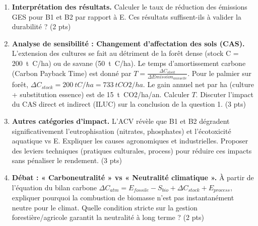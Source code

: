 \documentclass[11pt]{article}
\begin{document}
\begin{exercice}
\begin{enumerate}
\item \textbf{Interprétation des résultats.} Calculer le taux de réduction des émissions GES pour B1 et B2 par rapport à E. Ces résultats suffisent-ils à valider la durabilité ? (2 pts)
\item \textbf{Analyse de sensibilité : Changement d'affectation des sols (CAS).} L'extension des cultures se fait au détriment de la forêt dense (stock C = \SI{200}{t C/ha}) ou de savane (\SI{50}{t C/ha}). Le temps d'amortissement carbone (Carbon Payback Time) est donné par $T = \frac{\Delta C_{stock}}{\Delta Emission_{annuelle}}$. Pour le palmier sur forêt, $\Delta C_{stock} = \SI{200}{t C/ha} = \SI{733}{t CO2/ha}$. Le gain annuel net par ha (culture + substitution essence) est de \SI{15}{t CO2/ha/an}. Calculer $T$. Discuter l'impact du CAS direct et indirect (ILUC) sur la conclusion de la question 1. (3 pts)
\item \textbf{Autres catégories d'impact.} L'ACV révèle que B1 et B2 dégradent significativement l'eutrophisation (nitrates, phosphates) et l'écotoxicité aquatique vs E. Expliquer les causes agronomiques et industrielles. Proposer des leviers techniques (pratiques culturales, process) pour réduire ces impacts sans pénaliser le rendement. (3 pts)
\item \textbf{Débat : « Carboneutralité » vs « Neutralité climatique ».} À partir de l'équation du bilan carbone $\Delta C_{atm} = E_{fossile} - S_{bio} + \Delta C_{stock} + E_{process}$, expliquer pourquoi la combustion de biomasse n'est pas instantanément neutre pour le climat. Quelle condition stricte sur la gestion forestière/agricole garantit la neutralité à long terme ? (2 pts)
\end{enumerate}
\end{exercice}
\end{document}
